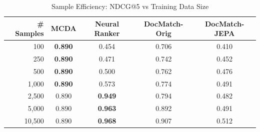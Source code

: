 \begin{table}[t]
\centering
\caption{Sample Efficiency: NDCG@5 vs Training Data Size}
\label{tab:sample_efficiency}
\begin{tabular}{@{}rcccc@{}}
\toprule
\textbf{\# Samples} & \textbf{MCDA} & \textbf{Neural Ranker} & \textbf{DocMatch-Orig} & \textbf{DocMatch-JEPA} \\
\midrule
100 & \textbf{0.890} & 0.454 & 0.706 & 0.410 \\
250 & \textbf{0.890} & 0.471 & 0.742 & 0.452 \\
500 & \textbf{0.890} & 0.500 & 0.762 & 0.476 \\
1,000 & \textbf{0.890} & 0.573 & 0.774 & 0.491 \\
2,500 & 0.890 & \textbf{0.949} & 0.794 & 0.482 \\
5,000 & 0.890 & \textbf{0.963} & 0.892 & 0.491 \\
10,500 & 0.890 & \textbf{0.968} & 0.907 & 0.512 \\
\bottomrule
\end{tabular}
\end{table}